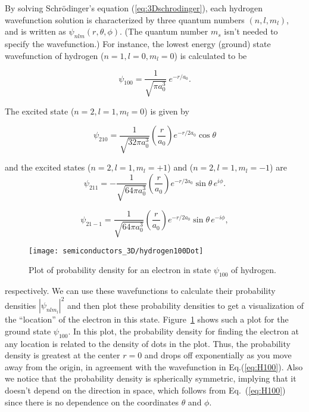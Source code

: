By solving Schr\"{o}dinger's equation (\ref{eq:3Dschrodinger}), each
hydrogen wavefunction solution is characterized by three quantum
numbers $\left(n, l, m_l\right)$, and is written as
$\psi_{nlm}(r,\theta,\phi)$.  (The quantum number $m_s$ isn't needed
to specify the wavefunction.)  For instance, the lowest energy
(ground) state wavefunction of hydrogen ($n=1, l=0, m_l=0$) is
calculated to be

\begin{equation}
\psi_{100} = \frac{1}{\sqrt{\pi a_0^3}}\ e^{-r/a_0} .
\label{eq:H100}
\end{equation}

\noindent The excited state ($n=2, l=1, m_l=0$) is given by

\begin{equation}
\psi_{210} = \frac{1}{\sqrt{32\pi a_0^3}} \left( \frac{r}{a_0} \right)
e^{-r/2a_0} \cos{\theta}
\label{eq:H210}
\end{equation}

\noindent and the excited states ($n=2, l=1, m_l=+1$) and ($n=2, l=1,
m_l=-1$) are
\begin{equation}
\psi_{211} = -\frac{1}{\sqrt{64\pi a_0^3}} \left( \frac{r}{a_0}
\right) e^{-r/2a_0} \sin{\theta}\, e^{i\phi}.
\label{eq:H211}
\end{equation}

\begin{equation}
\psi_{21-1} = \frac{1}{\sqrt{64\pi a_0^3}} \left( \frac{r}{a_0}
\right) e^{-r/2a_0} \sin{\theta}\, e^{-i\phi} ,
\label{eq:H21-1}
\end{equation}

\begin{figure}
\begin{center}
\texttt{[image: semiconductors\_3D/hydrogen100Dot]}
\end{center}
\caption{Plot of probability density for an electron in state
  $\psi_{100}$ of hydrogen.}
\label{fig:hydrogen100Dot}
\end{figure}
\noindent respectively. We can use these wavefunctions to calculate
their probability densities $\left|\psi_{nlm_l}\right|^2$ and then
plot these probability densities to get a visualization of the
``location'' of the electron in this state.
Figure~\ref{fig:hydrogen100Dot} shows such a plot for the ground state
$\psi_{100}$.  In this plot, the probability density for finding the
electron at any location is related to the density of dots in the
plot.  Thus, the probability density is greatest at the center $r=0$
and drops off exponentially as you move away from the origin, in
agreement with the wavefunction in Eq.(\ref{eq:H100}). Also we notice
that the probability density is spherically symmetric, implying that
it doesn't depend on the direction in space, which follows from
Eq.~(\ref{eq:H100}) since there is no dependence on the coordinates
$\theta$ and $\phi$.

